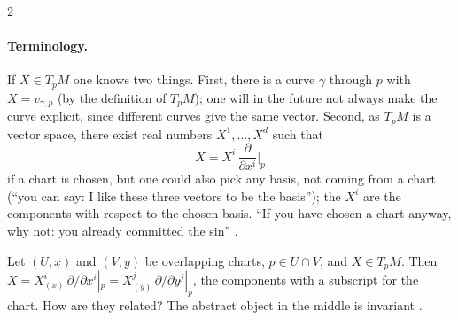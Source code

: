 \begin{paracol}{2}
\paragraph{Terminology.} If $X\in T_pM$ one knows two things. First, there is a curve $\gamma$ through $p$ with $X=v_{\gamma,p}$ (by the definition of $T_pM$); one will in the future not always make the curve explicit, since different curves give the same vector. Second, as $T_pM$ is a vector space, there exist real numbers $X^1,\dots,X^d$ such that
\[
  X=X^i\,\frac{\partial}{\partial x^i}\Big|_p
\]
if a chart is chosen, but one could also pick any basis, not coming from a chart (``you can say: I like these three vectors to be the basis''); the $X^i$ are the components with respect to the chosen basis. ``If you have chosen a chart anyway, why not: you already committed the sin''
.

Let $(U,x)$ and $(V,y)$ be overlapping charts, $p\in U\cap V$, and $X\in T_pM$. Then $X=X^i_{(x)}\,\partial/\partial x^i|_p=X^j_{(y)}\,\partial/\partial y^j|_p$, the components with a subscript for the chart. How are they related? The abstract object in the middle is invariant .


\end{paracol}
